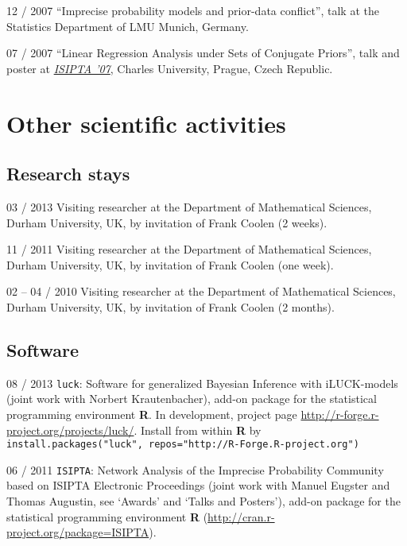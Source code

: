 \documentclass[a4paper]{simplecv}
\begin{document}
\begin{topic}
\item[12 / 2007] ``Imprecise probability models and prior-data conflict'', talk at
                 the Statistics Department of LMU Munich, Germany.

\item[07 / 2007] ``Linear Regression Analysis under Sets of Conjugate Priors'', talk and poster at
                 \emph{\href{http://www.sipta.org/isipta07/}{ISIPTA '07}}, Charles University, Prague, Czech Republic.

\end{topic}




\section{Other scientific activities}
\label{other}

\subsection{Research stays}
\begin{topic}
\item[03 / 2013] Visiting researcher at the Department of Mathematical Sciences, Durham University, UK,
                 by invitation of Frank Coolen (2 weeks).
\item[11 / 2011] Visiting researcher at the Department of Mathematical Sciences, Durham University, UK,
                 by invitation of Frank Coolen (one week).
\item[02 -- 04 / 2010] Visiting researcher at the Department of Mathematical Sciences, Durham University, UK,
                 by invitation of Frank Coolen (2 months).
\end{topic}

\subsection{Software}

\begin{topic}
\item[08 / 2013] \texttt{luck}: Software for generalized Bayesian Inference with iLUCK-models (joint work with Norbert Krautenbacher),
                 add-on package for the statistical programming environment \textbf{R}. In development, project page
                 \url{http://r-forge.r-project.org/projects/luck/}.
                 Install from within \textbf{R} by\\ \texttt{install.packages("luck", repos="http://R-Forge.R-project.org")}
\item[06 / 2011] \texttt{ISIPTA}: Network Analysis of the Imprecise Probability Community based on ISIPTA Electronic Proceedings
                 (joint work with Manuel Eugster and Thomas Augustin, see `Awards' and `Talks and Posters'),
                 add-on package for the statistical programming environment \textbf{R} (\url{http://cran.r-project.org/package=ISIPTA}).
\end{topic}
\end{document}
